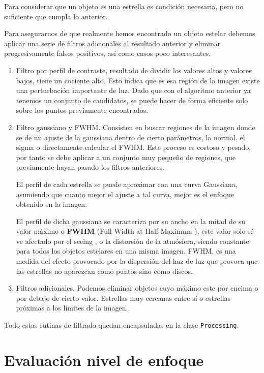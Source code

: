Para considerar que un objeto es una estrella es condición necesaria, pero no suficiente que cumpla lo anterior.

Para asegurarnos de que realmente hemos encontrado un objeto estelar debemos aplicar una serie de filtros adicionales al resultado anterior y eliminar progresivamente falsos positivos, así como casos poco interesantes. 

\begin{enumerate}
	\item Filtro por perfil de contraste, resultado de dividir los valores altos y valores bajos, tiene un cociente alto. Esto indica que es esa región de la imagen existe una perturbación importante de luz. Dado que con el algoritmo anterior ya tenemos un conjunto de candidatos, se puede hacer de forma eficiente solo sobre los puntos previamente encontrados. 
	
	\item Filtro gaussiano y FWHM. Consisten en buscar regiones de la imagen donde se de un ajuste de la gaussiana dentro de cierto parámetros, la normal, el sigma o directamente calcular el FWHM. Este proceso es costoso y pesado, por tanto se debe aplicar a un conjunto muy pequeño de regiones, que previamente hayan pasado los filtros anteriores.
	
	El perfil de cada estrella se puede aproximar con una curva Gaussiana, asumiendo que cuanto mejor el ajuste a tal curva, mejor es el enfoque obtenido en la imagen.
	
	El perfil  de dicha gaussiana se caracteriza por su ancho en la mitad de su valor máximo o \textbf{FWHM} (Full Width at Half Maximum \cite{fwhm}), este valor solo sé ve afectado por el seeing \cite{seeing}, o la distorsión de la atmósfera, siendo constante para todos los objetos estelares en una misma imagen. FWHM, es una medida del efecto provocado por la dispersión del haz de luz que provoca que las estrellas no aparezcan como puntos sino como discos.
		
	\item  Filtros adicionales. Podemos eliminar objetos cuyo máximo este por encima o por debajo de cierto valor.
	Estrellas muy cercanas entre sí o estrellas próximas a los límites de la imagen. 	
\end{enumerate}

Todo estas rutinas de filtrado quedan encapsuladas en la clase \texttt{Processing}.


\section{Evaluación nivel de enfoque}

